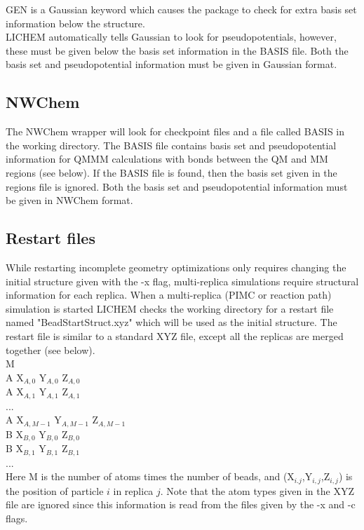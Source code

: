 \documentclass[12pt]{report}
\begin{document}
GEN is a Gaussian keyword which causes the package to check for extra basis
set information below the structure. \\

LICHEM automatically tells Gaussian to look for pseudopotentials, however,
these must be given below the basis set information in the BASIS file.
Both the basis set and pseudopotential information must be given in Gaussian
format.

\subsection{NWChem}

The NWChem wrapper will look for checkpoint files and a file called BASIS in
the working directory.
The BASIS file contains basis set and pseudopotential information for QMMM
calculations with bonds between the QM and MM regions (see below).
If the BASIS file is found, then the basis set given in the regions file is
ignored.
Both the basis set and pseudopotential information must be given in NWChem
format.

\subsection{Restart files}

While restarting incomplete geometry optimizations only requires changing
the initial structure given with the -x flag, multi-replica simulations
require structural information for each replica.
When a multi-replica (PIMC or reaction path) simulation is started LICHEM
checks the working directory for a restart file named "BeadStartStruct.xyz"
which will be used as the initial structure.
The restart file is similar to a standard XYZ file, except all the replicas
are merged together (see below). \\

M \\

A  X$_{A,0}$  Y$_{A,0}$  Z$_{A,0}$ \\
A  X$_{A,1}$  Y$_{A,1}$  Z$_{A,1}$ \\
... \\
A  X$_{A,M-1}$  Y$_{A,M-1}$  Z$_{A,M-1}$ \\
B  X$_{B,0}$  Y$_{B,0}$  Z$_{B,0}$ \\
B  X$_{B,1}$  Y$_{B,1}$  Z$_{B,1}$ \\
... \\

Here M is the number of atoms times the number of beads, and
(X$_{i.j}$,Y$_{i,j}$,Z$_{i,j}$) is the position of particle $i$ in replica
$j$.
Note that the atom types given in the XYZ file are ignored since this
information is read from the files given by the -x and -c flags.
\end{document}

